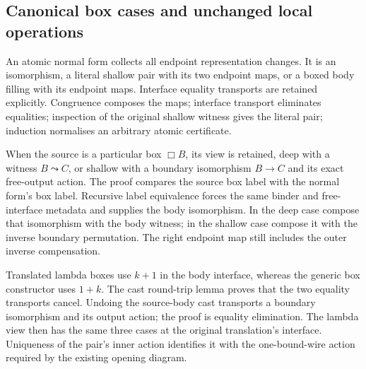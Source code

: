 
\subsection{Canonical box cases and unchanged local operations}
An atomic normal form collects all endpoint representation changes. It is
an isomorphism, a literal shallow pair with its two endpoint maps, or a boxed
body filling with its endpoint maps. Interface equality transports are
retained explicitly. Congruence composes the maps; interface transport
eliminates equalities; inspection of the original shallow witness gives the
literal pair; induction normalises an arbitrary atomic certificate.


When the source is a particular box $\Box B$, its view is retained, deep
with a witness $B\leadsto C$, or shallow with a boundary isomorphism
$B\to C$ and its exact free-output action. The proof compares the source
box label with the normal form's box label. Recursive label equivalence
forces the same binder and free-interface metadata and supplies the body
isomorphism. In the deep case compose that isomorphism with the body witness;
in the shallow case compose it with the inverse boundary permutation.
The right endpoint map still includes the outer inverse compensation.


Translated lambda boxes use $k+1$ in the body interface, whereas the generic
box constructor uses $1+k$. The cast round-trip lemma proves that the two
equality transports cancel. Undoing the source-body cast transports a
boundary isomorphism and its output action; the proof is equality elimination.
The lambda view then has the same three cases at the original translation's
interface. Uniqueness of the pair's inner action identifies it with the
one-bound-wire action required by the existing opening diagram.

